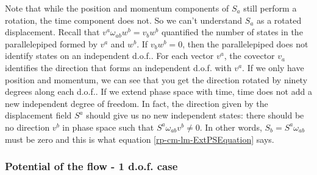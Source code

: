 Note that while the position and momentum components of $S_a$ still perform a rotation, the time component does not. So we can't understand $S_a$ as a rotated displacement. Recall that $v^a \omega_{ab} w^b = v_b w^b$ quantified the number of states in the parallelepiped formed by $v^a$ and $w^b$. If $v_b w^b = 0$, then the parallelepiped does not identify states on an independent d.o.f.. For each vector $v^a$, the covector $v_a$ identifies the direction that forms an independent d.o.f. with $v^a$. If we only have position and momentum, we can see that you get the direction rotated by ninety degrees along each d.o.f.. If we extend phase space with time, time does not add a new independent degree of freedom. In fact, the direction given by the displacement field $S^a$ should give us no new independent states: there should be no direction $v^b$ in phase space such that $S^a \omega_{ab} v^b \neq 0$. In other words, $S_b = S^a \omega_{ab}$ must be zero and this is what equation \ref{rp-cm-lm-ExtPSEquation} says.

\subsubsection{Potential of the flow - 1 d.o.f. case}


